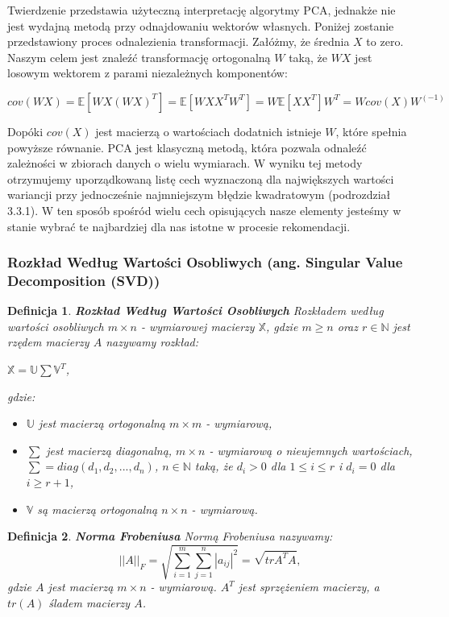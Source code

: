 \documentclass[12pt,a4paper]{report}
\newtheorem{df}{Definicja}[chapter]
\begin{document}
Twierdzenie przedstawia użyteczną interpretację algorytmy PCA, jednakże nie jest wydajną metodą przy odnajdowaniu wektorów własnych. Poniżej zostanie przedstawiony proces odnalezienia transformacji.
Załóżmy, że średnia $X$ to zero. Naszym celem jest znaleźć transformację ortogonalną $W$ taką, że $WX$ jest losowym wektorem z parami niezależnych komponentów:
\begin{center}
$cov(WX) = \mathbb{E}[WX(WX)^T]
= \mathbb{E}[WX X^T W^T]
=W \mathbb{E}[XX^T]W^T
=W cov(X)W^{(-1)}$
\end{center}
Dopóki $cov(X)$ jest macierzą o wartościach dodatnich istnieje $W$, które spełnia powyższe równanie.
PCA jest klasyczną metodą, która pozwala odnaleźć zależności w zbiorach danych o wielu wymiarach. W wyniku tej metody otrzymujemy uporządkowaną listę cech wyznaczoną dla największych wartości wariancji przy jednocześnie najmniejszym błędzie kwadratowym (podrozdział 3.3.1). W ten sposób spośród wielu cech opisujących nasze elementy jesteśmy w stanie wybrać te najbardziej dla nas istotne w procesie rekomendacji.
\subsubsection{Rozkład Według Wartości Osobliwych (ang. Singular Value Decomposition (SVD))} 
\begin{df} \textbf{Rozkład Według Wartości Osobliwych}%
Rozkładem według wartości osobliwych $m\times n$ - wymiarowej macierzy $\mathbb{X}$, gdzie $m\geq n$ oraz $r \in \mathbb{N}$ jest rzędem macierzy $A$ nazywamy rozkład:
\begin{center}
$\mathbb{X}=\mathbb{U}\sum \mathbb{V}^T$,
\end{center}  
gdzie:
\begin{itemize}
\item $\mathbb{U}$ jest macierzą ortogonalną $m \times m$ - wymiarową,
\item $\sum $ jest macierzą diagonalną, $m \times n$ - wymiarową o nieujemnych wartościach, $\sum = diag(d_1, d_2,..., d_n)$, $n \in \mathbb{N}$ taką, że $d_i>0$ dla $1\leq i \leq r$ i $d_i=0$ dla $i\geq r+1$,
\item $\mathbb{V}$ są macierzą ortogonalną $n \times n$ - wymiarową.
\end{itemize}
\end{df}
\begin{df}\textbf{Norma Frobeniusa}%
Normą Frobeniusa nazywamy:
$$||A||_F = \sqrt{\sum_{i=1}^m \sum_{j=1}^n |a_{ij}|^2} = \sqrt{tr A^T A},$$
gdzie $A$ jest macierzą $m\times n$ - wymiarową. $ A^T$ jest sprzężeniem macierzy, a $tr(A)$ śladem macierzy $A$.
\end{df}
\end{document}
